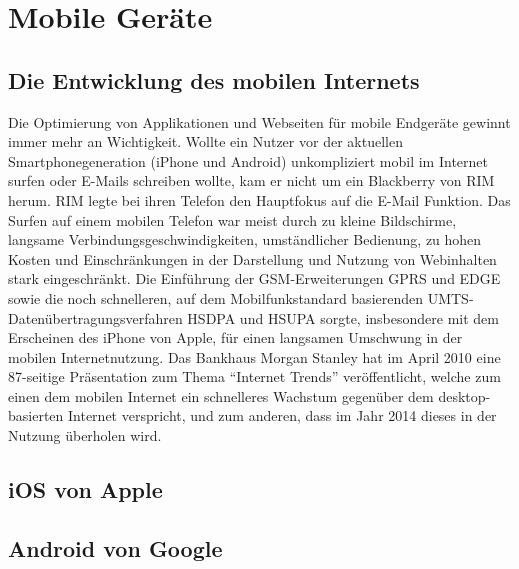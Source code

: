 \chapter{Mobile Geräte}

\section{Die Entwicklung des mobilen Internets}
Die Optimierung von Applikationen und Webseiten für mobile Endgeräte gewinnt
immer mehr an Wichtigkeit. Wollte ein Nutzer vor der aktuellen Smartphonegeneration 
(iPhone und Android) unkompliziert mobil im Internet surfen oder E-Mails schreiben 
wollte, kam er nicht um ein Blackberry von RIM herum. RIM legte bei ihren Telefon
den Hauptfokus auf die E-Mail Funktion. Das Surfen auf einem mobilen Telefon
war meist durch zu kleine Bildschirme, langsame Verbindungsgeschwindigkeiten,
umständlicher Bedienung, zu hohen Kosten und Einschränkungen in der Darstellung
und Nutzung von Webinhalten stark eingeschränkt. Die Einführung der 
GSM-Erweiterungen GPRS und EDGE sowie die noch schnelleren, auf dem 
Mobilfunkstandard basierenden UMTS-Datenübertragungsverfahren HSDPA und
HSUPA sorgte, insbesondere mit dem Erscheinen des iPhone von Apple, für einen
langsamen Umschwung in der mobilen Internetnutzung. Das Bankhaus Morgan
Stanley hat im April 2010 eine 87-seitige Präsentation zum Thema "`Internet Trends"'
veröffentlicht, welche zum einen dem mobilen Internet ein schnelleres Wachstum 
gegenüber dem desktop-basierten Internet verspricht, und zum anderen, dass im
Jahr 2014 dieses in der Nutzung überholen wird.

\section{iOS von Apple}
\section{Android von Google}
